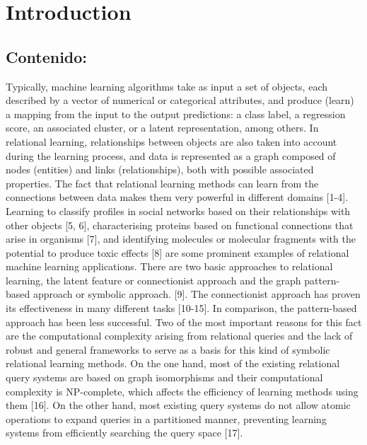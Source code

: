 \documentclass{article}%
\begin{document}
%
\normalsize%
\clearpage%
\section{Introduction}%
\label{sec:Introduction}%
\subsection{Contenido:}%
\label{subsec:Contenido}%
Typically, machine learning algorithms take as input a set of objects, each described by a vector of numerical or categorical attributes, and produce (learn) a mapping from the input to the output predictions: a class label, a regression score, an associated cluster, or a latent representation, among others. In relational learning, relationships between objects are also taken into account during the learning process, and data is represented as a graph composed of nodes (entities) and links (relationships), both with possible associated properties.\newline%
\newline%
The fact that relational learning methods can learn from the connections between data makes them very powerful in different domains {[}1{-}4{]}. Learning to classify profiles in social networks based on their relationships with other objects {[}5, 6{]}, characterising proteins based on functional connections that arise in organisms {[}7{]}, and identifying molecules or molecular fragments with the potential to produce toxic effects {[}8{]} are some prominent examples of relational machine learning applications.\newline%
\newline%
There are two basic approaches to relational learning, the latent feature or connectionist approach and the graph pattern{-}based approach or symbolic approach. {[}9{]}. The connectionist approach has proven its effectiveness in many different tasks {[}10{-}15{]}. In comparison, the pattern{-}based approach has been less successful. Two of the most important reasons for this fact are the computational complexity arising from relational queries and the lack of robust and general frameworks to serve as a basis for this kind of symbolic relational learning methods. On the one hand, most of the existing relational query systems are based on graph isomorphisms and their computational complexity is NP{-}complete, which affects the efficiency of learning methods using them {[}16{]}. On the other hand, most existing query systems do not allow atomic operations to expand queries in a partitioned manner, preventing learning systems from efficiently searching the query space {[}17{]}.\newline%
\end{document}
